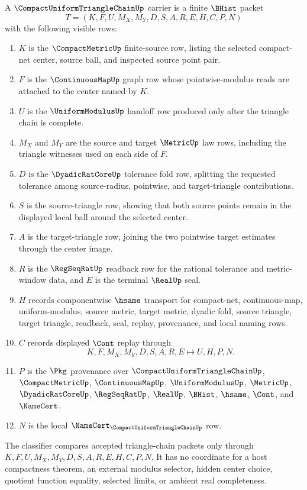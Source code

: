 \begin{definition}
\label{def:compact-uniform-triangle-chain-carrier}
A $\CompactUniformTriangleChainUp$ carrier is a finite $\BHist$ packet
$$
T=(K,F,U,M_X,M_Y,D,S,A,R,E,H,C,P,N)
$$
with the following visible rows:
\begin{enumerate}
\item $K$ is the $\CompactMetricUp$ finite-source row, listing the selected compact-net center, source ball, and inspected source point pair.
\item $F$ is the $\ContinuousMapUp$ graph row whose pointwise-modulus reads are attached to the center named by $K$.
\item $U$ is the $\UniformModulusUp$ handoff row produced only after the triangle chain is complete.
\item $M_X$ and $M_Y$ are the source and target $\MetricUp$ law rows, including the triangle witnesses used on each side of $F$.
\item $D$ is the $\DyadicRatCoreUp$ tolerance fold row, splitting the requested tolerance among source-radius, pointwise, and target-triangle contributions.
\item $S$ is the source-triangle row, showing that both source points remain in the displayed local ball around the selected center.
\item $A$ is the target-triangle row, joining the two pointwise target estimates through the center image.
\item $R$ is the $\RegSeqRatUp$ readback row for the rational tolerance and metric-window data, and $E$ is the terminal $\RealUp$ seal.
\item $H$ records componentwise $\hsame$ transport for compact-net, continuous-map, uniform-modulus, source metric, target metric, dyadic fold, source triangle, target triangle, readback, seal, replay, provenance, and local naming rows.
\item $C$ records displayed $\Cont$ replay through
$$
K,F,M_X,M_Y,D,S,A,R,E \longmapsto U,H,P,N .
$$
\item $P$ is the $\Pkg$ provenance over $\CompactUniformTriangleChainUp$, $\CompactMetricUp$, $\ContinuousMapUp$, $\UniformModulusUp$, $\MetricUp$, $\DyadicRatCoreUp$, $\RegSeqRatUp$, $\RealUp$, $\BHist$, $\hsame$, $\Cont$, and $\NameCert$.
\item $N$ is the local $\NameCert_{\CompactUniformTriangleChainUp}$ row.
\end{enumerate}
The classifier compares accepted triangle-chain packets only through $K,F,U,M_X,M_Y,D,S,A,R,E,H,C,P,N$. It has no coordinate for a host compactness theorem, an external modulus selector, hidden center choice, quotient function equality, selected limits, or ambient real completeness.
\end{definition}

